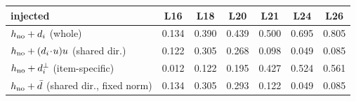 \begin{tabular}{lcccccc}
\toprule
injected & L16 & L18 & L20 & L21 & L24 & L26 \\
\midrule
$h_{\text{no}} + d_i$ (whole) & 0.134 & 0.390 & 0.439 & 0.500 & 0.695 & 0.805 \\
$h_{\text{no}} + (d_i\!\cdot\!u)u$ (shared dir.) & 0.122 & 0.305 & 0.268 & 0.098 & 0.049 & 0.085 \\
$h_{\text{no}} + d_i^{\perp}$ (item-specific) & 0.012 & 0.122 & 0.195 & 0.427 & 0.524 & 0.561 \\
$h_{\text{no}} + \bar{d}$ (shared dir., fixed norm) & 0.134 & 0.305 & 0.293 & 0.122 & 0.049 & 0.085 \\
\bottomrule
\end{tabular}
